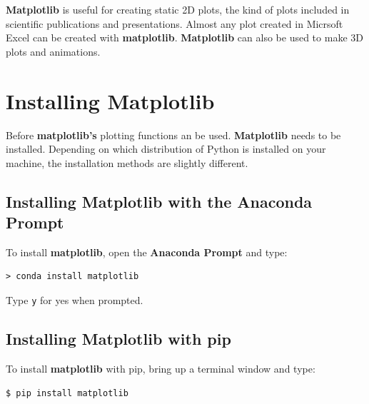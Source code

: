 \documentclass{book}
\begin{document}
    
        \textbf{Matplotlib} is useful for creating static 2D plots, the kind of
plots included in scientific publications and presentations. Almost any
plot created in Micrsoft Excel can be created with \textbf{matplotlib}.
\textbf{Matplotlib} can also be used to make 3D plots and animations.
    




    
        \section{Installing Matplotlib}\label{installing-matplotlib}
    




    
        Before \textbf{matplotlib's} plotting functions an be used.
\textbf{Matplotlib} needs to be installed. Depending on which
distribution of Python is installed on your machine, the installation
methods are slightly different.
    




    
        \subsection{Installing Matplotlib with the Anaconda
Prompt}\label{installing-matplotlib-with-the-anaconda-prompt}

To install \textbf{matplotlib}, open the \textbf{Anaconda Prompt} and
type:

\begin{lstlisting}
> conda install matplotlib
\end{lstlisting}

Type \lstinline!y! for yes when prompted.
    




    
        \subsection{Installing Matplotlib with
pip}\label{installing-matplotlib-with-pip}
    




    
        To install \textbf{matplotlib} with pip, bring up a terminal window and
type:

\begin{lstlisting}
$ pip install matplotlib
\end{lstlisting}
\end{document}
